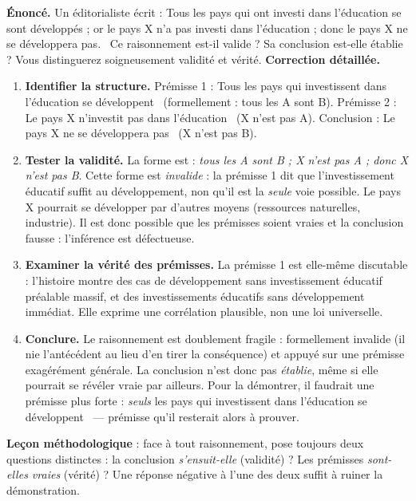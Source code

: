 \documentclass[11pt]{article}
\begin{document}
\begin{exoresolu}
\textbf{Énoncé.} Un éditorialiste écrit : \guillemotleft Tous les pays qui ont investi dans l'éducation se sont développés ; or le pays X n'a pas investi dans l'éducation ; donc le pays X ne se développera pas. \guillemotright\ Ce raisonnement est-il valide ? Sa conclusion est-elle établie ? Vous distinguerez soigneusement validité et vérité.
\tcblower
\textbf{Correction détaillée.}
\begin{enumerate}
\item \textbf{Identifier la structure.} Prémisse 1 : \guillemotleft Tous les pays qui investissent dans l'éducation se développent \guillemotright\ (formellement : tous les A sont B). Prémisse 2 : \guillemotleft Le pays X n'investit pas dans l'éducation \guillemotright\ (X n'est pas A). Conclusion : \guillemotleft Le pays X ne se développera pas \guillemotright\ (X n'est pas B).
\item \textbf{Tester la validité.} La forme est : \emph{tous les A sont B ; X n'est pas A ; donc X n'est pas B}. Cette forme est \emph{invalide} : la prémisse 1 dit que l'investissement éducatif suffit au développement, non qu'il est la \emph{seule} voie possible. Le pays X pourrait se développer par d'autres moyens (ressources naturelles, industrie). Il est donc possible que les prémisses soient vraies et la conclusion fausse : l'inférence est défectueuse.
\item \textbf{Examiner la vérité des prémisses.} La prémisse 1 est elle-même discutable : l'histoire montre des cas de développement sans investissement éducatif préalable massif, et des investissements éducatifs sans développement immédiat. Elle exprime une corrélation plausible, non une loi universelle.
\item \textbf{Conclure.} Le raisonnement est doublement fragile : formellement invalide (il nie l'antécédent au lieu d'en tirer la conséquence) et appuyé sur une prémisse exagérément générale. La conclusion n'est donc pas \emph{établie}, même si elle pourrait se révéler vraie par ailleurs. Pour la démontrer, il faudrait une prémisse plus forte : \guillemotleft \emph{seuls} les pays qui investissent dans l'éducation se développent \guillemotright\ — prémisse qu'il resterait alors à prouver.
\end{enumerate}
\textbf{Leçon méthodologique} : face à tout raisonnement, pose toujours deux questions distinctes : la conclusion \emph{s'ensuit-elle} (validité) ? Les prémisses \emph{sont-elles vraies} (vérité) ? Une réponse négative à l'une des deux suffit à ruiner la démonstration.
\end{exoresolu}
\end{document}

